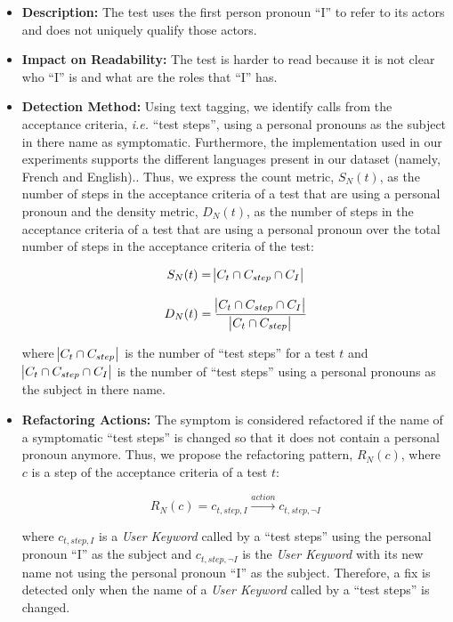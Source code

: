 \begin{itemize}
    \item \textbf{Description:} The test uses the first person pronoun ``I'' to refer to its actors and does not uniquely qualify those actors.

    \item \textbf{Impact on Readability:} The test is harder to read because it is not clear who ``I'' is and what are the roles that ``I'' has.
    
    \item \textbf{Detection Method:} Using text tagging, we identify calls from the acceptance criteria, \emph{i.e.} ``test steps'', using a personal pronouns as the subject in there name as symptomatic. Furthermore, the implementation used in our experiments supports the different languages present in our dataset (namely, French and English).. Thus, we express the count metric, $S_{N}(t)$, as the number of steps in the acceptance criteria of a test that are using a personal pronoun and the density metric, $D_{N}(t)$, as the number of steps in the acceptance criteria of a test that are using a personal pronoun over the total number of steps in the acceptance criteria of the test:
    
    \begin{equation*}
        S_{N}(t) = \abs{C_{t} \cap C_{step} \cap C_{I}}
    \end{equation*}
    
    \begin{equation*}
        D_{N}(t) = \frac{\abs{C_{t} \cap C_{step} \cap C_{I}}}{\abs{C_{t} \cap C_{step}}}
    \end{equation*}
    
    where  $\abs{C_{t} \cap C_{step}}$ is the number of ``test steps'' for a test $t$ and $\abs{C_{t} \cap C_{step} \cap C_{I}}$ is the number of ``test steps'' using a personal pronouns as the subject in there name.
    
    \item \textbf{Refactoring Actions:} The symptom is considered refactored if the name of a symptomatic ``test steps'' is changed so that it does not contain a personal pronoun anymore. Thus,  we propose the refactoring pattern, $R_{N}(c)$, where $c$ is a step of the acceptance criteria of a test $t$:
    
    \begin{equation*}
        R_{N}(c) = c_{t, step, I} \xrightarrow{action} c_{t, step, \neg I}
    \end{equation*}
    
    where $c_{t, step, I}$ is a \emph{User Keyword} called by a ``test steps'' using the personal pronoun ``I'' as the subject and $c_{t, step, \neg I}$ is the \emph{User Keyword} with its new name not using the personal pronoun ``I'' as the subject. Therefore, a fix is detected only when the name of a \emph{User Keyword} called by a ``test steps'' is changed.
\end{itemize}

